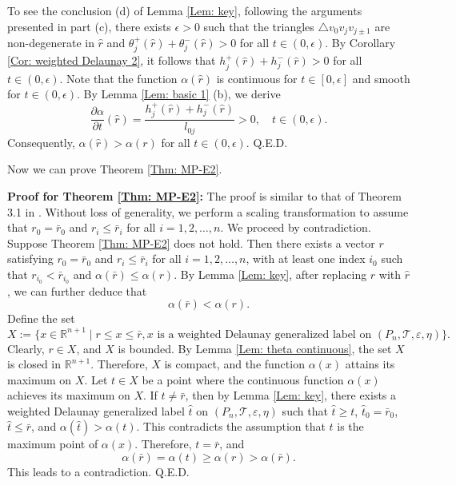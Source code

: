 \documentclass[12pt]{amsart}
\theoremstyle{definition}
\def\qed{\hfill{Q.E.D.}\smallskip}
\begin{document}
To see the conclusion (d) of Lemma \ref{Lem: key}, following the arguments presented in part (c), there exists $\epsilon>0$ such that the triangles $\triangle v_0v_jv_{j\pm1}$ are non-degenerate in $\hat{r}$ and $\theta_{j}^+(\hat{r})+\theta_{j}^-(\hat{r})>0$ for all $t\in(0,\epsilon)$.  
By Corollary \ref{Cor: weighted Delaunay 2},  
it follows that $h_j^+(\hat{r})+h_j^-(\hat{r})>0$ for all $t\in(0,\epsilon)$.  
Note that the function $\alpha(\hat{r})$ is continuous for $t\in[0,\epsilon]$ and smooth for $t\in(0,\epsilon)$.  
By Lemma \ref{Lem: basic 1} (b), we derive 
\begin{equation*}  
\frac{\partial \alpha}{\partial t}(\hat{r})  
=\frac{h_j^+(\hat{r})+h_j^-(\hat{r})}{l_{0j}}>0,\quad  
t\in(0,\epsilon).  
\end{equation*}  
Consequently, $\alpha(\hat{r})>\alpha(r)$ for all $t\in(0,\epsilon)$.
\qed


Now we can prove Theorem \ref{Thm: MP-E2}.

\noindent\textbf{Proof for Theorem \ref{Thm: MP-E2}:}
The proof is similar to that of Theorem 3.1 in \cite{LSW}.  
Without loss of generality, we perform a scaling transformation to assume that $r_0=\bar{r}_0$ and $r_i\le\bar{r}_i$ for all $i=1,2,\dots,n$.  
We proceed by contradiction. Suppose Theorem \ref{Thm: MP-E2} does not hold.  
Then there exists a vector $r$ satisfying $r_0=\bar{r}_0$ and $r_i\le\bar{r}_i$ for all $i=1,2,\dots,n$, with at least one index $i_0$ such that $r_{i_0}<\bar{r}_{i_0}$ and $\alpha(\bar{r})\leq\alpha(r)$.  
By Lemma \ref{Lem: key}, after replacing $r$ with $\hat{r}$, we can further deduce that
\begin{equation*}  
\alpha(\bar{r})<\alpha(r).  
\end{equation*}  
Define the set  
\begin{equation*}  
X:=\{x\in\mathbb{R}^{n+1}\mid r\le x\le \bar{r}, \text{$x$ is a weighted Delaunay generalized label on $(P_n, \mathcal{T}, \varepsilon, \eta)$}\}.  
\end{equation*}  
Clearly, $r\in X$, and $X$ is bounded.  
By Lemma \ref{Lem: theta continuous}, the set $X$ is closed in $\mathbb{R}^{n+1}$.  
Therefore, $X$ is compact, and the function $\alpha(x)$ attains its maximum on $X$. 
Let $t\in X$ be a point where the continuous function $\alpha(x)$ achieves its maximum on $X$.  
If $t\neq\bar{r}$, then by Lemma \ref{Lem: key},  
there exists a weighted Delaunay generalized label $\hat{t}$ on $(P_n, \mathcal{T}, \varepsilon, \eta)$ such that $\hat{t}\ge t$, $\hat{t}_0=\bar{r}_0$, $\hat{t}\le\bar{r}$, and $\alpha(\hat{t})>\alpha(t)$.
This contradicts the assumption that $t$ is the maximum point of $\alpha(x)$.  
Therefore, $t=\bar{r}$, and 
\begin{equation*}  
\alpha(\bar{r})=\alpha(t)\ge\alpha(r)>\alpha(\bar{r}).  
\end{equation*}  
This leads to a contradiction. 
\qed
\end{document}
